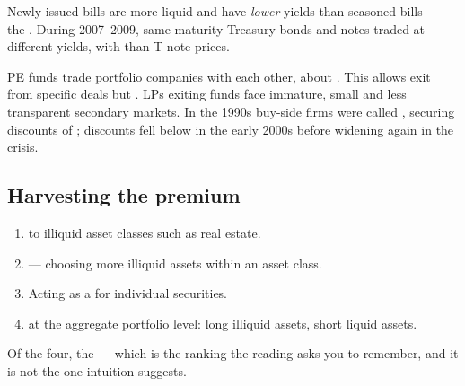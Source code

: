 \begin{imkeybox}[title={Illiquidity effects in other markets}]
 Newly issued  bills are more liquid and
have \emph{lower} yields than seasoned  bills --- the
. During 2007--2009, same-maturity Treasury
bonds and notes traded at different yields, with  than T-note prices.

\smallskip
{} PE funds trade portfolio companies with each
other, about . This allows exit from specific
deals but . LPs exiting funds face immature, small
and less transparent secondary markets. In the 1990s buy-side firms were called
, securing discounts of ; discounts fell
below  in the early 2000s before widening again in the crisis.
\end{imkeybox}

\subsection{Harvesting the premium}

\begin{enumerate}
\item {} to illiquid asset classes such as real estate.
\item {} --- choosing more illiquid assets within
an asset class.
\item Acting as a  for individual securities.
\item {} at the aggregate portfolio level: long
illiquid assets, short liquid assets.
\end{enumerate}

\begin{imkeybox}
Of the four, the  --- which is the ranking the reading asks
you to remember, and it is not the one intuition suggests.
\end{imkeybox}


